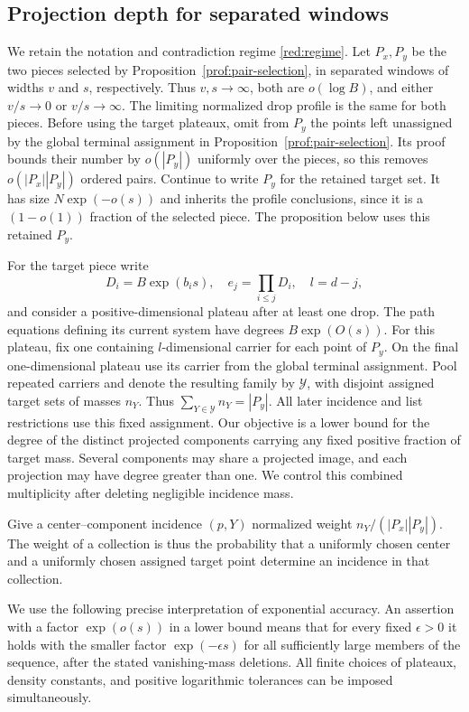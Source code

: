 \subsection{Projection depth for separated windows}\label{dep:section}

We retain the notation and contradiction regime \eqref{red:regime}.
Let $P_x,P_y$ be the two pieces selected by
Proposition~\ref{prof:pair-selection}, in separated windows of widths
$v$ and $s$, respectively. Thus $v,s\to\infty$, both are
$o(\log B)$, and either $v/s\to0$ or $v/s\to\infty$.
The limiting normalized drop profile is the same for both pieces.
Before using the target plateaux, omit from $P_y$ the points left
unassigned by the global terminal assignment in
Proposition~\ref{prof:pair-selection}. Its proof bounds their number
by $o(|P_y|)$ uniformly over the pieces, so this removes
$o(|P_x||P_y|)$ ordered pairs. Continue to write $P_y$ for the
retained target set. It has size $N\exp(-o(s))$ and inherits the
profile conclusions, since it is a $(1-o(1))$ fraction of the
selected piece. The proposition below uses this retained $P_y$.

For the target piece write
\[
 D_i=B\exp(b_i s),\quad e_j=\prod_{i\le j}D_i,
 \quad l=d-j,
\]
and consider a positive-dimensional plateau after at least one drop.
The path equations defining its current system have degrees
$B\exp(O(s))$. For this plateau, fix one containing
$l$-dimensional carrier for each point of $P_y$. On the final
one-dimensional plateau use its carrier from the global terminal
assignment. Pool repeated carriers and denote the resulting family
by $\mathcal Y$, with disjoint assigned target sets of masses $n_Y$.
Thus $\sum_{Y\in\mathcal Y}n_Y=|P_y|$. All later incidence and list
restrictions use this fixed assignment.
Our objective is a lower bound for the degree of the distinct
projected components carrying any fixed positive fraction of target
mass.  Several components may share a projected image, and each
projection may have degree greater than one.  We control this combined
multiplicity after deleting negligible incidence mass.

Give a center--component incidence $(p,Y)$ normalized weight
$n_Y/(|P_x||P_y|)$.  The weight of a collection is thus the probability
that a uniformly chosen center and a uniformly chosen assigned target
point determine an incidence in that collection.

We use the following precise interpretation of exponential accuracy.
An assertion with a factor $\exp(o(s))$ in a lower bound means that
for every fixed $\epsilon>0$ it holds with the smaller factor
$\exp(-\epsilon s)$ for all sufficiently large members of the
sequence, after the stated vanishing-mass deletions.
All finite choices of plateaux, density constants, and positive
logarithmic tolerances can be imposed simultaneously.


